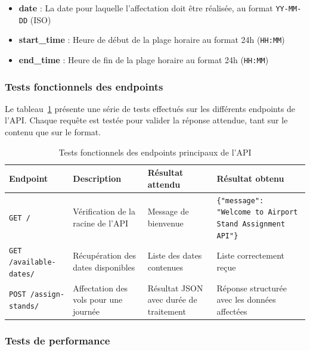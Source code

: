 \begin{itemize}
	\item \textbf{date} : La date pour laquelle l’affectation doit être réalisée, au format \texttt{YY-MM-DD} (ISO)
	\item \textbf{start\_time} : Heure de début de la plage horaire au format 24h (\texttt{HH:MM})
	\item \textbf{end\_time} : Heure de fin de la plage horaire au format 24h (\texttt{HH:MM})
\end{itemize}
\vspace{-0.5em}
\subsubsection{Tests fonctionnels des endpoints}
\vspace{-0.7em}
Le tableau~\ref{tab:tests-endpoints} présente une série de tests effectués sur les différents endpoints de l’API. Chaque requête est testée pour valider la réponse attendue, tant sur le contenu que sur le format.
\vspace{-1em}
\begin{table}[H]
	\centering
	\renewcommand{\arraystretch}{0.6}
	\caption{Tests fonctionnels des endpoints principaux de l’API}
	\begin{tabularx}{\textwidth}{p{3.3cm} p{3.5cm} p{3.5cm} p{4.6cm}}
		\toprule
		\textbf{Endpoint} & \textbf{Description} & \textbf{Résultat attendu} & \textbf{Résultat obtenu} \\
		\midrule
		\texttt{GET /} &
		Vérification de la racine de l'API &
		Message de bienvenue &
		\texttt{\{"message": "Welcome to Airport Stand Assignment API"\}} \\
		
		\midrule
		\texttt{GET /available-dates/} &
		Récupération des dates disponibles &
		Liste des dates contenues&
		Liste correctement reçue \\
		
		\midrule
		\texttt{POST /assign-stands/} &
		Affectation des vols pour une journée &
		Résultat JSON avec durée de traitement &
		Réponse structurée avec les données affectées \\
		
		\bottomrule
	\end{tabularx}
	\label{tab:tests-endpoints}
\end{table}

\vspace{-1.7em}


\subsubsection{Tests de performance}

